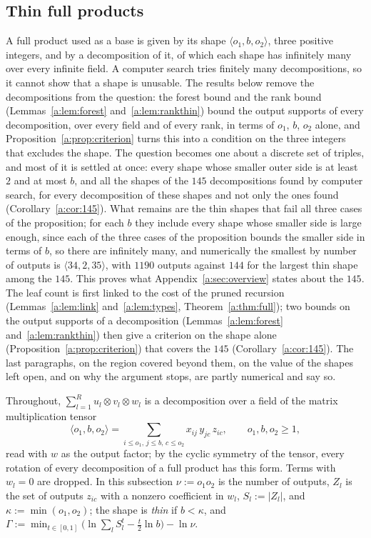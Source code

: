 \documentclass[11pt]{article}
\theoremstyle{definition}
\theoremstyle{remark}
\begin{document}
\subsection{Thin full products}\label{a:sec:full}

A full product used as a base is given by its shape $\langle o_1,b,o_2\rangle$, three positive integers, and by a decomposition of it, of which each shape has infinitely many over every infinite field. A computer search tries finitely many decompositions, so it cannot show that a shape is unusable. The results below remove the decompositions from the question: the forest bound and the rank bound (Lemmas~\ref{a:lem:forest} and~\ref{a:lem:rankthin}) bound the output supports of every decomposition, over every field and of every rank, in terms of $o_1$, $b$, $o_2$ alone, and Proposition~\ref{a:prop:criterion} turns this into a condition on the three integers that excludes the shape. The question becomes one about a discrete set of triples, and most of it is settled at once: every shape whose smaller outer side is at least $2$ and at most $b$, and all the shapes of the $145$ decompositions found by computer search, for every decomposition of these shapes and not only the ones found (Corollary~\ref{a:cor:145}). What remains are the thin shapes that fail all three cases of the proposition; for each $b$ they include every shape whose smaller side is large enough, since each of the three cases of the proposition bounds the smaller side in terms of $b$, so there are infinitely many, and numerically the smallest by number of outputs is $\langle34,2,35\rangle$, with $1190$ outputs against $144$ for the largest thin shape among the $145$. This proves what Appendix~\ref{a:sec:overview} states about the $145$. The leaf count is first linked to the cost of the pruned recursion (Lemmas~\ref{a:lem:link} and~\ref{a:lem:types}, Theorem~\ref{a:thm:full}); two bounds on the output supports of a decomposition (Lemmas~\ref{a:lem:forest} and~\ref{a:lem:rankthin}) then give a criterion on the shape alone (Proposition~\ref{a:prop:criterion}) that covers the $145$ (Corollary~\ref{a:cor:145}). The last paragraphs, on the region covered beyond them, on the value of the shapes left open, and on why the argument stops, are partly numerical and say so.

Throughout, $\sum_{l=1}^R u_l\otimes v_l\otimes w_l$ is a decomposition over a field of the matrix multiplication tensor
\[
\langle o_1,b,o_2\rangle=\sum_{i\le o_1,\,j\le b,\,c\le o_2}x_{ij}\,y_{jc}\,z_{ic},\qquad o_1,b,o_2\ge1,
\]
read with $w$ as the output factor; by the cyclic symmetry of the tensor, every rotation of every decomposition of a full product has this form. Terms with $w_l=0$ are dropped. In this subsection $\nu:=o_1o_2$ is the number of outputs, $Z_l$ is the set of outputs $z_{ic}$ with a nonzero coefficient in $w_l$, $S_l:=|Z_l|$, and $\kappa:=\min(o_1,o_2)$; the shape is \emph{thin} if $b<\kappa$, and $\Gamma:=\min_{t\in[0,1]}\big(\ln\sum_lS_l^t-\frac t2\ln b\big)-\ln \nu$.
\end{document}
